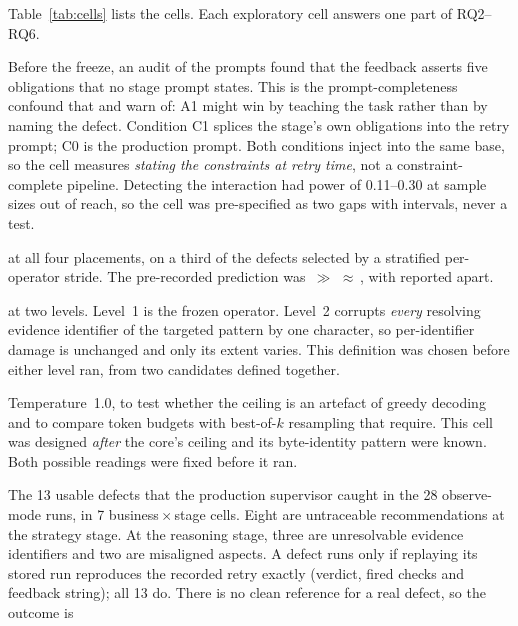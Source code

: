 Table~\ref{tab:cells} lists the cells. Each exploratory cell answers one part
of RQ2--RQ6.

\begin{description}[leftmargin=1.2em,style=nextline]
\item[Constraint disclosure (C1).] Before the freeze, an audit of the prompts
  found that the  feedback asserts five obligations that no stage prompt
  states. This is the prompt-completeness confound that \citet{huang2024cannot}
  and \citet{kamoi2024} warn of: A1 might win by teaching the task rather than
  by naming the defect. Condition C1 splices the stage's own obligations into
  the retry prompt; C0 is the production prompt. Both conditions inject into the
  same base, so the cell measures \emph{stating the constraints at retry time},
  not a constraint-complete pipeline. Detecting the interaction had power of
  0.11--0.30 at sample sizes out of reach, so the cell was pre-specified as two
  gaps with intervals, never a test.
\item[Placement.]  at all four placements, on a third of the defects
  selected by a stratified per-operator stride. The pre-recorded prediction was
  \,$\gg$\,\,$\approx$\,, with  reported apart.
\item[Severity.]  at two levels. Level~1 is the frozen operator. Level~2
  corrupts \emph{every} resolving evidence identifier of the targeted pattern
  by one character, so per-identifier damage is unchanged and only its extent
  varies. This definition was chosen before either level ran, from two
  candidates defined together.
\item[Warm resampling.] Temperature~1.0, to test whether the ceiling is an
  artefact of greedy decoding and to compare token budgets with
  best-of-$k$ resampling that \citet{olausson2024selfrepair} require. This cell
  was designed \emph{after} the core's ceiling and its byte-identity pattern
  were known. Both possible readings were fixed before it ran.
\item[Real-defect replay.] The 13 usable defects that the production
  supervisor caught in the 28 observe-mode runs, in 7 business\,$\times$\,stage
  cells. Eight are untraceable recommendations at the strategy stage. At the
  reasoning stage, three are unresolvable evidence identifiers and two are
  misaligned aspects. A defect runs only if replaying its stored run reproduces
  the recorded retry exactly (verdict, fired checks and feedback string); all
  13 do. There is no clean reference for a real defect, so the outcome is

\end{description}
